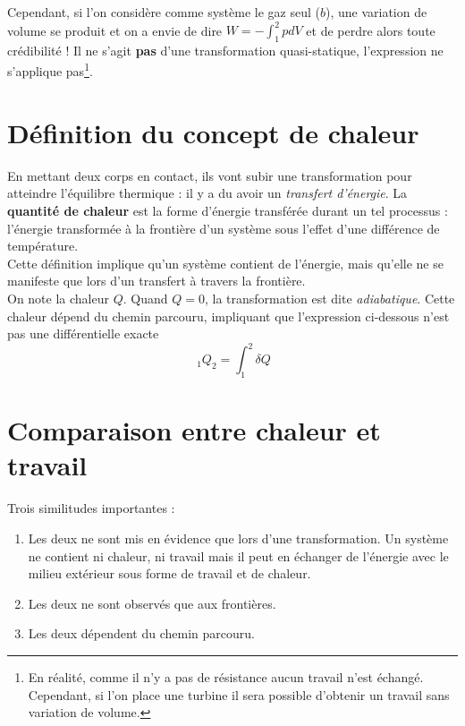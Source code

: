 Cependant, si l'on considère comme système le gaz seul ($b$),  une variation 
de volume se produit et on a envie de dire $W = -\int_1^2 pdV$ et 
de perdre alors toute crédibilité ! Il ne s'agit \textbf{pas} d'une 
transformation quasi-statique, l'expression ne s'applique pas\footnote{
	En réalité, comme il n'y a pas de résistance aucun travail n'est 
	échangé. Cependant, si l'on place une turbine il sera possible d'obtenir 
un travail sans variation de volume.}.


\section{Définition du concept de chaleur}
En mettant deux corps en contact, ils vont subir une transformation 
pour atteindre l'équilibre thermique : il y a du avoir un \textit{
	transfert d'énergie}. La \textbf{quantité de chaleur} est la forme 
d'énergie transférée durant un tel processus : l'énergie transformée
à la frontière d'un système sous l'effet d'une différence de 
température.\\

Cette définition implique qu'un système contient de l'énergie, mais 
qu'elle ne se manifeste que lors d'un transfert à travers la frontière.\\
On note la chaleur $Q$. Quand $Q=0$, la transformation est dite 
\textit{adiabatique}. Cette chaleur dépend du chemin parcouru, impliquant 
que l'expression ci-dessous n'est pas une différentielle exacte
\begin{equation}
	\ _1Q_2 = \int_1^2 \delta Q
\end{equation}


\section{Comparaison entre chaleur et travail}
Trois similitudes importantes :
\begin{enumerate}
	\item Les deux ne sont mis en évidence que lors d'une transformation. 
	      Un système ne contient ni chaleur, ni travail mais il peut en échanger 
	      de l'énergie avec le milieu extérieur sous forme de travail et de chaleur.
	\item Les deux ne sont observés que aux frontières.
	\item Les deux dépendent du chemin parcouru.
\end{enumerate}



